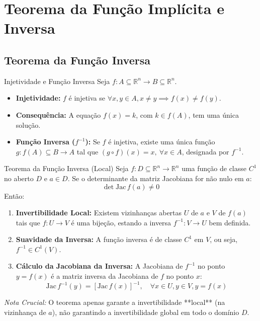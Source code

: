 \documentclass[11pt,a4paper]{article}
\newcommand{\R}{\mathbb{R}}
\begin{document}
\section{Teorema da Função Implícita e Inversa}
\label{chap:funcao_implicita_inversa}

\subsection{Teorema da Função Inversa}

\noindent\begin{definitionbox}{Injetividade e Função Inversa}
  Seja $f : A \subseteq \R^n \to B \subseteq \R^n$.
  \begin{itemize}
    \item \textbf{Injetividade:} $f$ é injetiva se $\forall x, y \in A, x \neq y \implies f(x) \neq f(y)$.
    \item \textbf{Consequência:} A equação $f(x) = k$, com $k \in f(A)$, tem uma única solução.
    \item \textbf{Função Inversa ($f^{-1}$):} Se $f$ é injetiva, existe uma única função $g : f(A) \subseteq B \to A$ tal que $(g \circ f)(x) = x, \ \forall x \in A$, designada por $f^{-1}$.
  \end{itemize}
\end{definitionbox}

\noindent\begin{theorembox}{Teorema da Função Inversa (Local)}
  Seja $f : D \subseteq \R^n \to \R^n$ uma função de classe $C^1$ no aberto $D$ e $a \in D$. Se o determinante da matriz Jacobiana for não nulo em $a$:
  \[ \det \text{Jac}\,f(a) \neq 0 \]
  Então:
  \begin{enumerate}
    \item \textbf{Invertibilidade Local:} Existem vizinhanças abertas $U$ de $a$ e $V$ de $f(a)$ tais que $f : U \to V$ é uma bijeção, estando a inversa $f^{-1} : V \to U$ bem definida.
    \item \textbf{Suavidade da Inversa:} A função inversa é de classe $C^1$ em $V$, ou seja, $f^{-1} \in C^1(V)$.
    \item \textbf{Cálculo da Jacobiana da Inversa:} A Jacobiana de $f^{-1}$ no ponto $y = f(x)$ é a matriz inversa da Jacobiana de $f$ no ponto $x$:
      \[ \text{Jac}\,f^{-1}(y) = \left[ \text{Jac}\,f(x) \right]^{-1}, \quad \forall x \in U, y \in V, y = f(x) \]
  \end{enumerate}
  \textit{Nota Crucial:} O teorema apenas garante a invertibilidade **local** (na vizinhança de $a$), não garantindo a invertibilidade global em todo o domínio $D$.
\end{theorembox}
\end{document}
